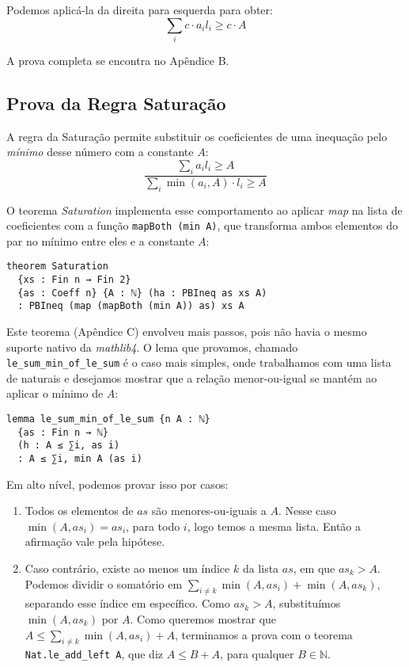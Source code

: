 \documentclass[conference]{IEEEtran}
\begin{document}
Podemos aplicá-la da direita para esquerda para obter:
\begin{equation}
    \sum_i{c \cdot a_i l_i} \ge c \cdot A
\end{equation}

A prova completa se encontra no Apêndice B.


\subsection{Prova da Regra Saturação}
A regra da Saturação permite substituir os coeficientes de uma inequação pelo \textit{mínimo} desse número com a constante $A$:
\begin{equation}
    \frac
    {\sum_i{a_i l_i} \ge A}
    {\sum_i{ \min(a_i,A)\cdot l_i} \ge A}
\end{equation}

O teorema \textit{Saturation} implementa esse comportamento ao aplicar \textit{map} na lista de coeficientes com a função
\texttt{mapBoth (min A)}, que transforma ambos elementos do par no mínimo entre eles e a constante $A$:
\begin{verbatim}
theorem Saturation
  {xs : Fin n → Fin 2}
  {as : Coeff n} {A : ℕ} (ha : PBIneq as xs A)
  : PBIneq (map (mapBoth (min A)) as) xs A
\end{verbatim}

Este teorema (Apêndice C) envolveu mais passos, pois não havia o mesmo suporte nativo da \textit{mathlib4}.
O lema que provamos, chamado \texttt{le\_sum\_min\_of\_le\_sum} é o caso mais simples, onde trabalhamos com uma
lista de naturais e desejamos mostrar que a relação menor-ou-igual se mantém ao aplicar o mínimo de $A$:
\begin{verbatim}
lemma le_sum_min_of_le_sum {n A : ℕ}
  {as : Fin n → ℕ}
  (h : A ≤ ∑i, as i)
  : A ≤ ∑i, min A (as i)
\end{verbatim}

Em alto nível, podemos provar isso por casos:
\begin{enumerate}
    \item Todos os elementos de $as$ são menores-ou-iguais a $A$.
          Nesse caso $\min(A,as_i) = as_i$, para todo $i$, logo temos a mesma lista.
          Então a afirmação vale pela hipótese.
    \item Caso contrário, existe ao menos um índice $k$ da lista $as$, em que $as_k > A$.
          Podemos dividir o somatório em $\sum_{i\neq k}{\min(A,as_i) + \min(A,as_k)}$, separando esse índice em específico.
          Como $as_k > A$, substituímos $\min(A,as_k)$ por $A$.
          Como queremos mostrar que $A \le \sum_{i\neq k}{\min(A,as_i) + A}$,
          terminamos a prova com o teorema \texttt{Nat.le\_add\_left A}, que diz
          $A \le B + A$, para qualquer $B \in \mathbb{N}$.

\end{enumerate}
\end{document}
